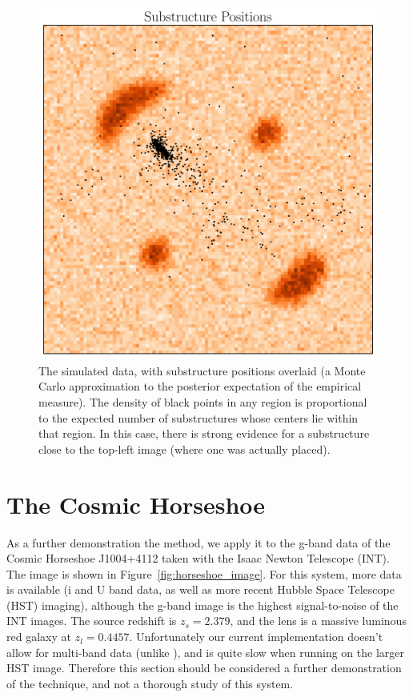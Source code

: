 \documentclass[useAMS,usenatbib]{mn2e}
\begin{document}
\begin{figure}
\begin{center}
\includegraphics[scale=0.4]{substructures.pdf}
\caption{The simulated data, with substructure positions overlaid (a
Monte Carlo approximation to the posterior expectation of the empirical
measure). The density of black points in any region is proportional to the
expected number of substructures whose centers lie within that region. In this
case, there is strong evidence for a substructure close to the top-left image
(where one was actually placed).
\label{fig:substructures}}
\end{center}
\end{figure}



\section{The Cosmic Horseshoe}
As a further demonstration the method, we apply it to the g-band data
of the Cosmic Horseshoe J1004+4112 \citep{belokurov, 2008MNRAS.388..384D} taken with the Isaac Newton Telescope (INT). The image is shown in Figure~\ref{fig:horseshoe_image}.
For this system,
more data is available (i and U band data, as well as more recent
Hubble Space Telescope (HST) imaging), although the g-band image is the highest
signal-to-noise of the INT images. The source redshift is $z_s=2.379$, and the
lens is a massive luminous red galaxy at $z_l=0.4457$.
Unfortunately our current implementation
doesn't allow for multi-band data (unlike \citet{2011MNRAS.412.2521B}), and
is quite slow when running on the larger HST image. Therefore this section
should be considered a further demonstration of the technique, and not a
thorough study of this system.
\end{document}
